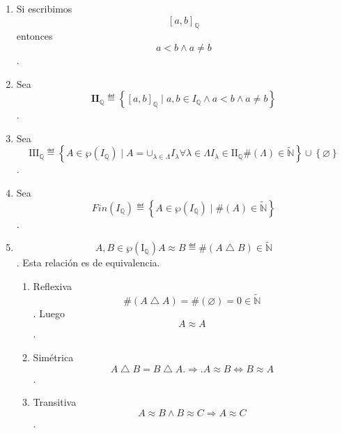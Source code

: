 \begin{enumerate}
\begin{enumerate}
    \begin{enumerate}
    \def\labelenumiii{\arabic{enumiii}.}
    \item
      Si escribimos \[\left\lbrack {a,b} \right\rbrack_{\mathbb{Q}}\]
      entonces \[{a < {b \land a}} \neq b\].
    \item
      Sea
      \[\mathbf{II}_{\mathbb{Q}} ≝ \left\{ {\left\lbrack {a,b} \right\rbrack_{\mathbb{Q}} \mid {a,{{{b \in {I_{\mathbb{Q}} \land a}} < {b \land a}} \neq b}}} \right\}\].
    \item
      Sea
      \[\mathbf{\mathrm{III}}_{\mathbb{Q}} ≝ {\left\{ {{A \in {\wp\left( I_{\mathbb{Q}} \right)}} \mid {{A = \mathbf{\cup}_{\lambda \in \Lambda}}I_{\lambda}\forall{\lambda \in \Lambda}{I_{\lambda} \in {\mathbf{\mathrm{II}}_{\mathbb{Q}}{{\#\left( \Lambda \right)} \in \widetilde{\mathbb{N}}}}}}} \right\} \cup \left\{ \varnothing \right\}}\]
      .
    \item
      Sea
      \[\mathit{Fin}\left( I_{\mathbb{Q}} \right) ≝ \left\{ {{A \in \wp}\left( I_{\mathbb{Q}} \right) \mid \#{(A) \in \widetilde{\mathbb{N}}}} \right\}\].
    \item
      \[A,B{\in}{\wp\left( \mathbf{\mathrm{I}}_{\mathbb{Q}} \right)}{A \approx B} ≝ {\#{\left( {A \bigtriangleup B} \right) \in \widetilde{\mathbb{N}}}}\].
      Esta relación es de equivalencia.

      \begin{enumerate}
      \def\labelenumiv{\arabic{enumiv}.}
      \item
        Reflexiva
        \[\#{\left( {A \bigtriangleup A} \right) = \#}{{(\varnothing) = 0} \in \widetilde{\mathbb{N}}}\].
        Luego \[A \approx A\].
      \item
        Simétrica
        \[A \bigtriangleup {B = B} \bigtriangleup A.\Rightarrow.A \approx B\Leftrightarrow B \approx A\].
      \item
        Transitiva
        \[A \approx {B \land B} \approx C\Rightarrow A \approx C\].


\end{enumerate}
\end{enumerate}
\end{enumerate}
\end{enumerate}
